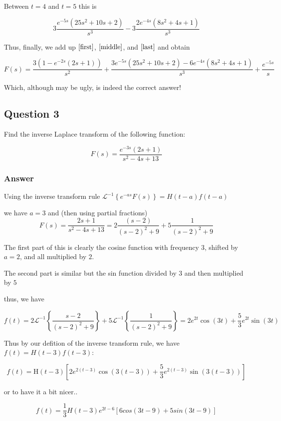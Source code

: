 \documentclass{article}
\begin{document}
Between $t=4$ and $t=5$ this is

\begin{equation}\label{middle}
3\frac{e^{-5s}\left(25s^2+10s+2\right)}{s^3} - 3\frac{2e^{-4s}\left(8s^2+4s+1\right)}{s^3}
\end{equation}

Thus, finally, we add up $\eqref{first}$, $\eqref{middle}$, and $\eqref{last}$ and obtain

$$
F(s) = \frac{3(1-e^{-2s}(2s+1))}{s^2} + \frac{3e^{-5s}\left(25s^2+10s+2\right) - 6e^{-4s}\left(8s^2+4s+1\right)}{s^3} + \frac{e^{-5s}}{s}
$$

Which, although may be ugly, is indeed the correct answer!
\subsection*{Question 3}

Find the inverse Laplace transform of the following function:

$$F(s) = \frac{e^{-3s}\left(2s+1\right)}{s^2-4s+13}$$

\subsubsection*{Answer}
Using the inverse transform rule $\mathcal{L}^{-1}\left\{e^{-as}F\left(s\right)\right\}=H\left(t-a\right)f\left(t-a\right)$

we have $a=3$ and (then using partial fractions)
$$F(s) = \frac{2s+1}{s^2-4s+13} = 2 \frac{(s-2)}{\left(s-2\right)^2+9}+5\frac{1}{\left(s-2\right)^2+9}$$

The first part of this is clearly the cosine function with frequency $3$, shifted by $a=2$, and all multiplied by $2$.

The second part is similar but the sin function divided by $3$ and then multiplied by $5$

thus, we have

$$f(t) = 2\mathcal{L}^{-1}\left\{\frac{s-2}{\left(s-2\right)^2+9}\right\}+5\mathcal{L}^{-1}\left\{\frac{1}{\left(s-2\right)^2+9}\right\} = 2e^{2t}\cos \left(3t\right)+\frac{5}{3}e^{2t}\sin \left(3t\right)$$

Thus by our defition of the inverse transform rule, we have $f(t) = H(t-3)f(t-3)$:

$$f(t) = \text{H}\left(t-3\right)\left[2e^{2\left(t-3\right)}\cos \left(3\left(t-3\right)\right)+\frac{5}{3}e^{2\left(t-3\right)}\sin \left(3\left(t-3\right)\right)\right]$$

or to have it a bit nicer..

$$f(t) = \frac{1}{3} H(t-3) e^{2t-6} \left[6cos\left(3t-9\right)+5sin\left(3t-9\right)\right]$$
\end{document}
